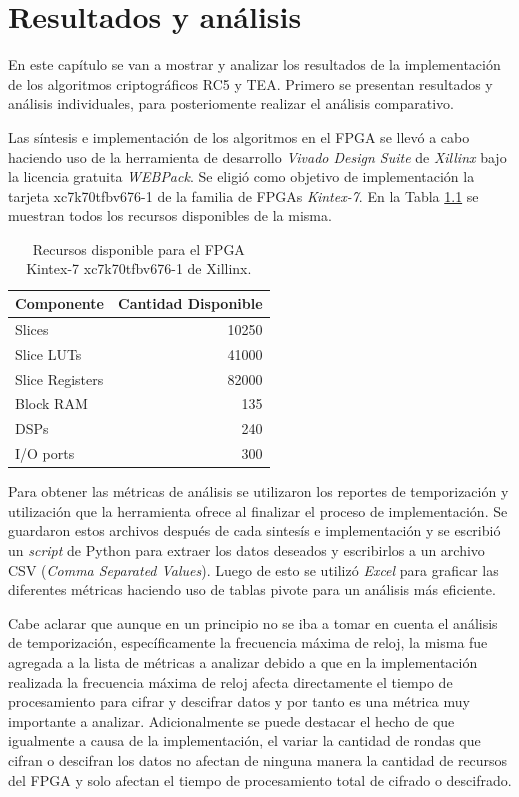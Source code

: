 \chapter{Resultados y análisis}
En este capítulo se van a mostrar y analizar los resultados de la implementación de los algoritmos criptográficos RC5 y TEA.
Primero se presentan resultados y análisis individuales, para posteriomente realizar el análisis comparativo.

Las síntesis e implementación de los algoritmos en el FPGA se llevó a cabo haciendo uso de la herramienta de desarrollo \textit{Vivado Design Suite} de \textit{Xillinx} bajo la licencia gratuita \textit{WEBPack}. Se eligió como objetivo de implementación la tarjeta xc7k70tfbv676-1 de la familia de FPGAs \textit{Kintex-7}. En la Tabla \ref{tabRecursosFPGA} se muestran todos los recursos disponibles de la misma. 

\begin{table}[htbp]
  \centering
  \caption{Recursos disponible para el FPGA Kintex-7 xc7k70tfbv676-1 de Xillinx.}
    \begin{tabular}{lr}
    \toprule
    Componente & Cantidad Disponible\\
    \midrule
	Slices & 10250\\
	Slice LUTs & 41000\\
	Slice Registers & 82000\\
	Block RAM & 135\\
	DSPs & 240\\
	I/O ports & 300\\
    \bottomrule
    \end{tabular}%
  \label{tabRecursosFPGA}%
\end{table}%

Para obtener las métricas de análisis se utilizaron los reportes de temporización y utilización que la herramienta ofrece al finalizar el proceso de implementación. Se guardaron estos archivos después de cada sintesís e implementación y se escribió un \textit{script} de Python para extraer los datos deseados y escribirlos a un archivo CSV (\textit{Comma Separated Values}). Luego de esto se utilizó \textit{Excel} para graficar las diferentes métricas haciendo uso de tablas pivote para un análisis más eficiente.


Cabe aclarar que aunque en un principio no se iba a tomar en cuenta el análisis de temporización, específicamente la frecuencia máxima de reloj, la misma fue agregada a la lista de métricas a analizar debido a que en la implementación realizada la frecuencia máxima de reloj afecta directamente el tiempo de procesamiento para cifrar y descifrar datos y por tanto es una métrica muy importante a analizar. Adicionalmente se puede destacar el hecho de que igualmente a causa de la implementación, el variar la cantidad de rondas que cifran o descifran los datos no afectan de ninguna manera la cantidad de recursos del FPGA y solo afectan el tiempo de procesamiento total de cifrado o descifrado.


